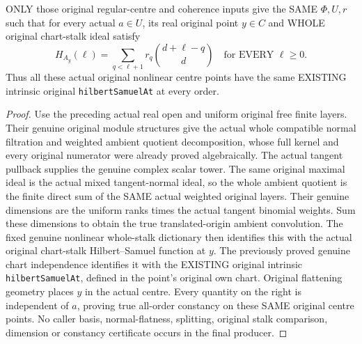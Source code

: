 \begin{theorem}
\label{hir:smooth-centre-real-original-ambient-hs-convolution}
\leanok
ONLY those original regular-centre and coherence inputs give the SAME
$\Phi,U,r$ such that for every actual $a\in U$, its real original point
$y\in C$ and WHOLE original chart-stalk ideal satisfy
\[
 H_{A_y}(\ell)=\sum_{q<\ell+1}r_q\binom{d+\ell-q}{d}
 \quad\text{for EVERY }\ell\geq0.
\]
Thus all these actual original nonlinear centre points have the same
EXISTING intrinsic original \texttt{hilbertSamuelAt} at every order.
\end{theorem}
\begin{proof}
Use the preceding actual real open and uniform original free finite layers.
Their genuine original module structures give the actual whole compatible
normal filtration and weighted ambient quotient decomposition, whose full
kernel and every original numerator were already proved algebraically.
The actual tangent pullback supplies the genuine complex scalar tower.
The same original maximal ideal is the actual mixed tangent-normal ideal,
so the whole ambient quotient is the finite direct sum of the SAME actual
weighted original layers. Their genuine dimensions are the uniform ranks
times the actual tangent binomial weights. Sum these dimensions to obtain
the true translated-origin ambient convolution. The fixed genuine nonlinear
whole-stalk dictionary then identifies this with the actual original
chart-stalk Hilbert--Samuel function at $y$. The previously proved genuine
chart independence identifies it with the EXISTING original intrinsic
\texttt{hilbertSamuelAt}, defined in the point's original own chart.
Original flattening geometry
places $y$ in the actual centre. Every quantity on the right is independent
of $a$, proving true all-order constancy on these SAME original centre points.
No caller basis, normal-flatness, splitting, original stalk comparison,
dimension or constancy certificate occurs in the final producer.
\end{proof}
